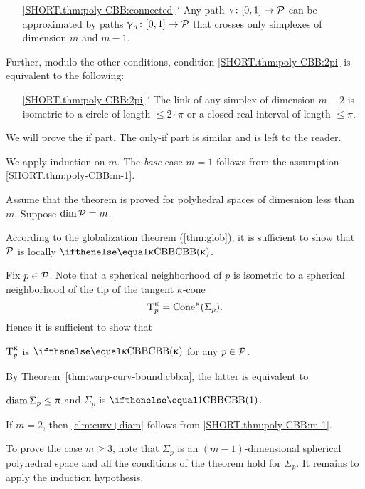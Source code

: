 \begin{itemize}
 \item[\ref{SHORT.thm:poly-CBB:connected}$\,'\!$] 
Any path $\gamma\:[0,1]\to \spc{P}$ can be approximated by paths
$\gamma_n\:[0,1]\to \spc{P}$ 
that crosses only simplexes of dimension $m$ and $m-1$.
\end{itemize}

Further, modulo the other conditions,
 condition \ref{SHORT.thm:poly-CBB:2pi}
is equivalent to the following:


\begin{itemize}
 \item[\ref{SHORT.thm:poly-CBB:2pi}$\,'\!$] 
The link of any simplex of dimension $m-2$ is 
isometric to a circle of length $\le 2\cdot\pi$
or a closed real interval of length $\le \pi$.
\end{itemize}

We will prove the if part.
The only-if part is similar and is left to the reader.

We apply induction on $m$.
The {}\emph{base} case $m=1$ follows from the assumption \ref{SHORT.thm:poly-CBB:m-1}.

Assume that the theorem is proved for polyhedral spaces  of dimesnion less than $m$.
Suppose  $\mathop{\rm dim}\nolimits\mathcal{P}=m$.

According to the globalization theorem (\ref{thm:glob}),
it is sufficient to show that 
$\mathcal{P}$  is locally $\Alex\kappa$. 

Fix $p\in \spc{P}$.
Note that a spherical neighborhood of $p$
is isometric
to a  spherical neighborhood of the tip of the tangent $\kappa$-cone 
$$\T_p\mc\kappa\z
=
\Cone\mc\kappa(\Sigma_p).$$
Hence it is sufficient to show that 
\begin{clm}{}
 $\text{\rm T}_p^{\upkappa}$ is $\Alex\kappa$ for any $p\in \spc{P}$.
\end{clm}

By Theorem~\ref{thm:warp-curv-bound:cbb:a}, 
the latter is equivalent to 
\begin{clm}{}\label{clm:curv+diam}
$\diam\Sigma_p\le \pi$ and $\Sigma_p$ is $\Alex1$.
\end{clm}


If $m=2$, then \ref{clm:curv+diam} follows from \ref{SHORT.thm:poly-CBB:m-1}.

To prove the case $m\ge 3$,
note that $\Sigma_p$ is an $(m-1)$-dimensional spherical polyhedral space and all the conditions of the theorem hold for $\Sigma_p$.
It remains to apply the induction hypothesis.\qeds

